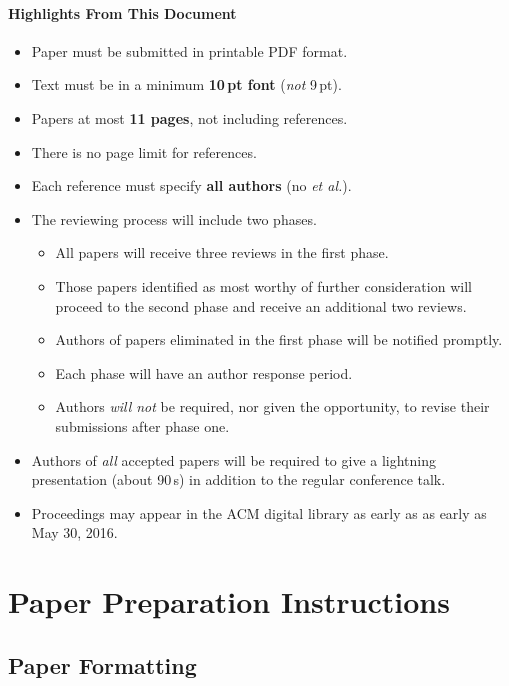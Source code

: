 \documentclass[pldi]{sigplanconf-pldi16}
\begin{document}
\paragraph{Highlights From This Document}
\begin{itemize}[noitemsep]
\item Paper must be submitted in printable PDF format.
\item Text must be in a minimum \textbf{10\,pt font} (\emph{not} 9\,pt).
\item Papers at most \textbf{11 pages}, not including references. 
\item There is no page limit for references. 
\item Each reference must specify \textbf{all authors} (no \emph{et al.}). 
\item The reviewing process will include two phases.
  \begin{itemize}
  \item All papers will receive three reviews in the first phase.
  \item Those papers identified as most worthy of further consideration will proceed to the second phase and receive an additional two reviews.
  \item Authors of papers eliminated in the first phase will be notified promptly.
  \item Each phase will have an author response period.
  \item Authors \emph{will not} be required, nor given the opportunity, to revise their submissions after phase one.
  \end{itemize}
\item Authors of \emph{all} accepted papers will be required to give a
  lightning presentation (about 90\,s) in addition to
  the regular conference talk.
\item Proceedings may appear in the ACM digital library as early as as early as May 30, 2016.
\end{itemize} 



\section{Paper Preparation Instructions}

\subsection{Paper Formatting}
\end{document}
